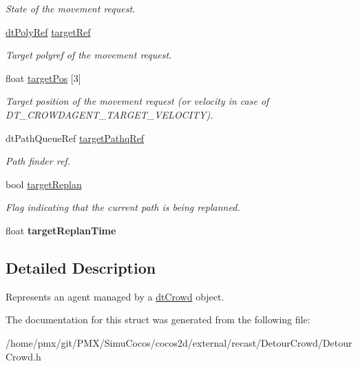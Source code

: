 \begin{DoxyCompactItemize}
\begin{DoxyCompactList}\small\item\em State of the movement request. \end{DoxyCompactList}\item 
\mbox{\label{structdtCrowdAgent_a0f33325c1c0bc4050eefe2e0690f84c6}} 
\hyperlink{group__detour_gab4e0b2257a670c1a800057999612b466}{dt\+Poly\+Ref} \hyperlink{structdtCrowdAgent_a0f33325c1c0bc4050eefe2e0690f84c6}{target\+Ref}
\begin{DoxyCompactList}\small\item\em Target polyref of the movement request. \end{DoxyCompactList}\item 
\mbox{\label{structdtCrowdAgent_aed0a0999d8d6d100667adff1f64e327f}} 
float \hyperlink{structdtCrowdAgent_aed0a0999d8d6d100667adff1f64e327f}{target\+Pos} \mbox{[}3\mbox{]}
\begin{DoxyCompactList}\small\item\em Target position of the movement request (or velocity in case of D\+T\+\_\+\+C\+R\+O\+W\+D\+A\+G\+E\+N\+T\+\_\+\+T\+A\+R\+G\+E\+T\+\_\+\+V\+E\+L\+O\+C\+I\+TY). \end{DoxyCompactList}\item 
\mbox{\label{structdtCrowdAgent_a1e0f72d182c9cf391300840ab293976e}} 
dt\+Path\+Queue\+Ref \hyperlink{structdtCrowdAgent_a1e0f72d182c9cf391300840ab293976e}{target\+Pathq\+Ref}
\begin{DoxyCompactList}\small\item\em Path finder ref. \end{DoxyCompactList}\item 
\mbox{\label{structdtCrowdAgent_a6300c91130b2690ac64e327e8909d2c8}} 
bool \hyperlink{structdtCrowdAgent_a6300c91130b2690ac64e327e8909d2c8}{target\+Replan}
\begin{DoxyCompactList}\small\item\em Flag indicating that the current path is being replanned. \end{DoxyCompactList}\item 
\mbox{\label{structdtCrowdAgent_a58585d67fe18e987898f2d42405608b4}} 
float {\bfseries target\+Replan\+Time}
\end{DoxyCompactItemize}


\subsection{Detailed Description}
Represents an agent managed by a \hyperlink{classdtCrowd}{dt\+Crowd} object. 

The documentation for this struct was generated from the following file\+:\begin{DoxyCompactItemize}
\item 
/home/pmx/git/\+P\+M\+X/\+Simu\+Cocos/cocos2d/external/recast/\+Detour\+Crowd/Detour\+Crowd.\+h\end{DoxyCompactItemize}
